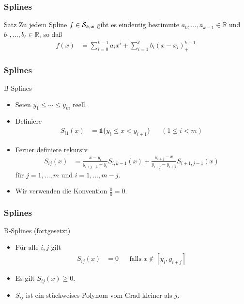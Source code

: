 \documentclass{beamer}
\def\vec#1{\mathchoice{\mbox{\boldmath$\displaystyle#1$}}
{\mbox{\boldmath$\textstyle#1$}}
{\mbox{\boldmath$\scriptstyle#1$}}
{\mbox{\boldmath$\scriptscriptstyle#1$}}}
\newcommand\cS{\mathcal S}
\newcommand\vx{\vec x}
\newcommand\RR{\mathbb R}
\newcommand{\vecone}{\mathbb{1}}
\newcommand{\ue}{\"u}
\newcommand{\mytitle}{Splines}
\begin{document}
\begin{frame}\frametitle{\mytitle}
	\begin{block}{Satz}
		Zu jedem Spline $f\in\cS_{k,\vx}$ gibt es eindeutig bestimmte $a_0,\ldots,a_{k-1}\in\RR$ und $b_1,\ldots,b_\ell\in\RR$, so da\ss
		\begin{align*}
			f(x)&=\sum_{i=0}^{k-1}a_ix^i+\sum_{i=1}^\ell b_i(x-x_i)^{k-1}_+
		\end{align*}
	\end{block}
\end{frame}

\begin{frame}\frametitle{\mytitle}
	\begin{block}{B-Splines}
	\begin{itemize}
	\item Seien $y_1\leq\cdots\leq y_m$ reell.
	\item Definiere
		\begin{align*}
			S_{i1}(x)&=\vecone\{y_i\leq x<y_{i+1}\}&&(1\leq i<m)
		\end{align*}
	\item Ferner definiere rekursiv
		\begin{align*}
			S_{ij}(x)&=\frac{x-y_i}{y_{i+j-1}-y_i}S_{i,k-1}(x)+\frac{y_{i+j}-x}{y_{i+j}-y_{i+1}}S_{i+1,j-1}(x)
		\end{align*}
		f\ue r $j=1,\ldots,m$ und $i=1,\ldots,m-j$.
		\item  Wir verwenden die Konvention $\frac{0}{0}=0$.
	\end{itemize}
	\end{block}
\end{frame}

\begin{frame}\frametitle{\mytitle}
	\begin{block}{B-Splines (fortgesetzt)}
		\begin{itemize}
			\item F\ue r alle $i,j$ gilt 
				\begin{align*}
					S_{ij}(x)&=0&&\mbox{falls }x\not\in[y_i,y_{i+j}]
				\end{align*}
			\item Es gilt $S_{ij}(x)\geq0$.
			\item $S_{ij}$ ist ein st\ue ckweises Polynom vom Grad kleiner als $j$.
		\end{itemize}
	\end{block}
\end{frame}
\end{document}
